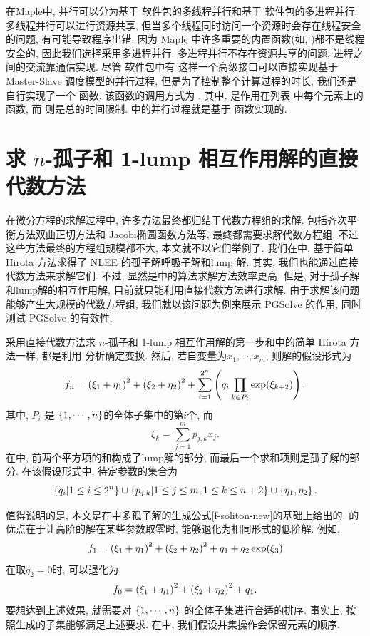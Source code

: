 在Maple中, 并行可以分为基于  软件包的多线程并行和基于  软件包的多进程并行. 多线程并行可以进行资源共享, 但当多个线程同时访问一个资源时会存在线程安全的问题, 有可能导致程序出错. 因为 Maple 中许多重要的内置函数(如, )都不是线程安全的, 因此我们选择采用多进程并行. 多进程并行不存在资源共享的问题, 进程之间的交流靠通信实现. 尽管  软件包中有  这样一个高级接口可以直接实现基于 Master-Slave 调度模型的并行过程, 但是为了控制整个计算过程的时长, 我们还是自行实现了一个  函数. 该函数的调用方式为 . 其中,  是作用在列表  中每个元素上的函数, 而  则是总的时间限制.  中的并行过程就是基于  函数实现的. 

\section{求 $n$-孤子和 1-lump 相互作用解的直接代数方法}
在微分方程的求解过程中, 许多方法最终都归结于代数方程组的求解. 包括齐次平衡方法\D 双曲正切方法和 Jacobi椭圆函数方法等, 最终都需要求解代数方程组. 不过这些方法最终的方程组规模都不大, 本文就不以它们举例了. 我们在中, 基于简单 Hirota 方法求得了 NLEE 的孤子解\D 呼吸子解和lump 解. 其实, 我们也能通过直接代数方法来求解它们. 不过, 显然是中的算法求解方法效率更高. 但是, 对于孤子解和lump解的相互作用解, 目前就只能利用直接代数方法进行求解. 由于求解该问题能够产生大规模的代数方程组, 我们就以该问题为例来展示 PGSolve 的作用, 同时测试 PGSolve 的有效性. 

采用直接代数方法求 $n$-孤子和 1-lump 相互作用解的第一步和中的简单 Hirota 方法一样, 都是利用 \Painleve{} 分析确定变换. 然后, 若自变量为$x_1,\cdots,x_m$, 则解的假设形式为
\begin{equation}
f_n=\left(\xi_1+\eta_1\right)^2+\left(\xi_2+\eta_2\right)^2+\sum_{i=1}^{2^n}\left(q_i\prod_{k \in P_i}{\exp(\xi_{k+2})}\right). \label{f-ns1l}
\end{equation}
其中, $P_i$ 是 $\left\{1,\cdots,n\right\}$的全体子集中的第$i$个, 而
\begin{equation}
\xi_k=\sum_{j=1}^m{p_{j,k}x_j}.
\end{equation}
在中, 前两个平方项的和构成了lump解的部分, 而最后一个求和项则是孤子解的部分. 在该假设形式中, 待定参数的集合为
\begin{equation}
    \left\{q_i|1\le i \le 2^n\right\} \cup \left\{p_{j,k}|1\le j \le m, 1\le k \le n+2\right\} \cup \left\{\eta_1,\eta_2\right\}. 
\end{equation}

值得说明的是, 本文是在中多孤子解的生成公式\ref{f-soliton-new}的基础上给出的. 的优点在于让高阶的解在某些参数取零时, 能够退化为相同形式的低阶解. 例如,
\begin{equation}
    f_1=\left(\xi_1+\eta_1\right)^2+\left(\xi_2+\eta_2\right)^2+q_1+q_2 \exp(\xi_3)
\end{equation}
在取$q_2=0$时, 可以退化为
\begin{equation}
    f_0=\left(\xi_1+\eta_1\right)^2+\left(\xi_2+\eta_2\right)^2+q_1.
\end{equation}
要想达到上述效果, 就需要对 $\left\{1,\cdots,n\right\}$ 的全体子集进行合适的排序. 事实上, 按照生成的子集能够满足上述要求. 在中, 我们假设并集操作会保留元素的顺序. 

